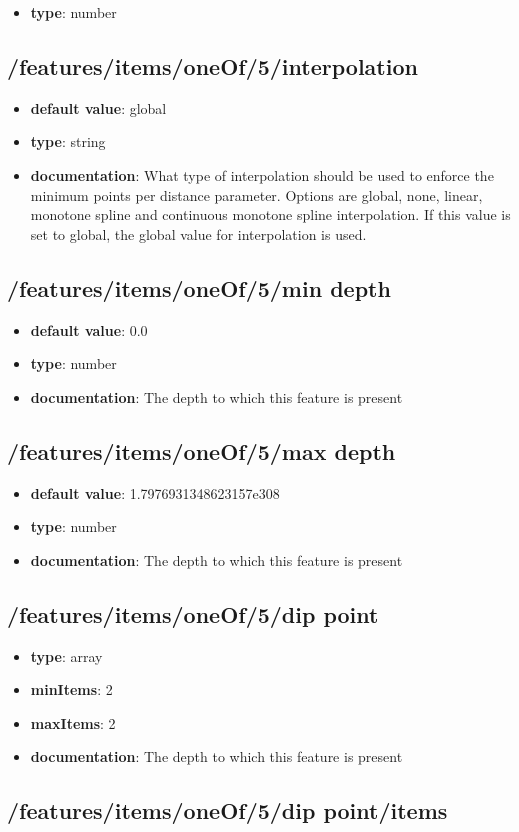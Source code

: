 \begin{itemize}\item {\bf type}: number
\end{itemize}\subsection{/features/items/oneOf/5/interpolation}
\begin{itemize}\item {\bf default value}: global
\item {\bf type}: string
\item {\bf documentation}: What type of interpolation should be used to enforce the minimum points per distance parameter. Options are global, none, linear, monotone spline and continuous monotone spline interpolation. If this value is set to global, the global value for interpolation is used.
\end{itemize}\subsection{/features/items/oneOf/5/min depth}
\begin{itemize}\item {\bf default value}: 0.0
\item {\bf type}: number
\item {\bf documentation}: The depth to which this feature is present
\end{itemize}\subsection{/features/items/oneOf/5/max depth}
\begin{itemize}\item {\bf default value}: 1.7976931348623157e308
\item {\bf type}: number
\item {\bf documentation}: The depth to which this feature is present
\end{itemize}\subsection{/features/items/oneOf/5/dip point}
\begin{itemize}\item {\bf type}: array
\item {\bf minItems}: 2
\item {\bf maxItems}: 2
\item {\bf documentation}: The depth to which this feature is present
\end{itemize}\subsection{/features/items/oneOf/5/dip point/items}

